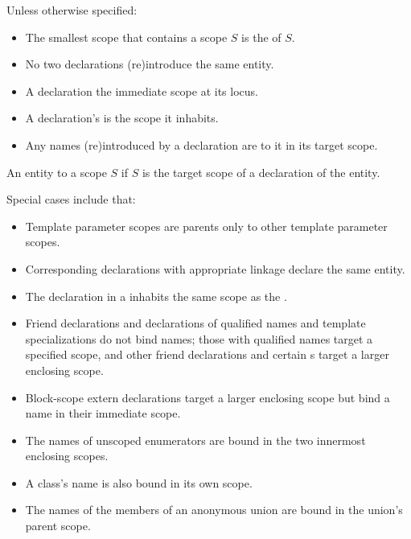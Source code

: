 \pnum
Unless otherwise specified:
\begin{itemize}
\item
The smallest scope that contains a scope $S$ is
the  of $S$.
\item
No two declarations (re)introduce the same entity.
\item
A declaration 
the immediate scope at its locus.
\item
A declaration's  is the scope it inhabits.
\item
Any names (re)introduced by a declaration are  to it
in its target scope.
\end{itemize}
An entity  to a scope $S$
if $S$ is the target scope of a declaration of the entity.
\begin{note}
Special cases include that:
\begin{itemize}
\item
Template parameter scopes are parents
only to other template parameter scopes.
\item
Corresponding declarations with appropriate linkage
declare the same entity.
\item
The declaration in a 
inhabits the same scope as the .
\item
Friend declarations and
declarations of qualified names and
template specializations do not bind names;
those with qualified names target a specified scope, and
other friend declarations and
certain s
target a larger enclosing scope.
\item
Block-scope extern declarations target a larger enclosing scope
but bind a name in their immediate scope.
\item
The names of unscoped enumerators are bound
in the two innermost enclosing scopes.
\item
A class's name is also bound in its own scope.
\item
The names of the members of an anonymous union are bound in
the union's parent scope.
\end{itemize}
\end{note}

